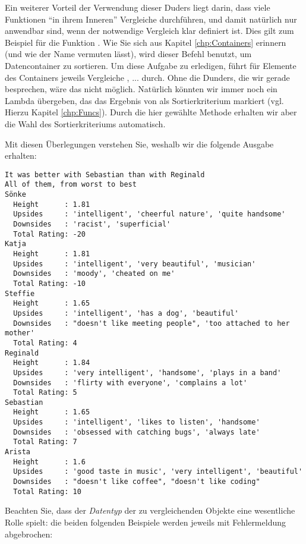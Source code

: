 Ein weiterer Vorteil der Verwendung dieser Duders liegt darin, dass viele Funktionen \enquote{in ihrem Inneren} Vergleiche durchführen, und damit natürlich nur anwendbar sind, wenn der notwendige Vergleich klar definiert ist. Dies gilt zum Beispiel für die Funktion . Wie Sie sich aus Kapitel \ref{chp:Containers} erinnern (und wie der Name vermuten lässt), wird dieser Befehl benutzt, um Datencontainer zu sortieren. Um diese Aufgabe zu erledigen, führt  für Elemente  des Containers jeweils Vergleiche , ... durch. Ohne die Dunders, die wir gerade besprechen, wäre das nicht möglich. Natürlich könnten wir immer noch ein Lambda übergeben, das das Ergebnis von  als Sortierkriterium markiert (vgl. Hierzu Kapitel \ref{chp:Funcs}). Durch die hier gewählte Methode erhalten wir aber die Wahl des Sortierkriteriums automatisch.

Mit diesen Überlegungen verstehen Sie, weshalb wir die folgende Ausgabe erhalten:

\begin{cmdbox}
\begin{verbatim}
It was better with Sebastian than with Reginald
All of them, from worst to best
Sönke
  Height      : 1.81
  Upsides     : 'intelligent', 'cheerful nature', 'quite handsome'
  Downsides   : 'racist', 'superficial'
  Total Rating: -20
Katja
  Height      : 1.81
  Upsides     : 'intelligent', 'very beautiful', 'musician'
  Downsides   : 'moody', 'cheated on me'
  Total Rating: -10
Steffie
  Height      : 1.65
  Upsides     : 'intelligent', 'has a dog', 'beautiful'
  Downsides   : "doesn't like meeting people", 'too attached to her mother'
  Total Rating: 4
Reginald
  Height      : 1.84
  Upsides     : 'very intelligent', 'handsome', 'plays in a band'
  Downsides   : 'flirty with everyone', 'complains a lot'
  Total Rating: 5
Sebastian
  Height      : 1.65
  Upsides     : 'intelligent', 'likes to listen', 'handsome'
  Downsides   : 'obsessed with catching bugs', 'always late'
  Total Rating: 7
Arista
  Height      : 1.6
  Upsides     : 'good taste in music', 'very intelligent', 'beautiful'
  Downsides   : "doesn't like coffee", "doesn't like coding"
  Total Rating: 10
\end{verbatim}
\end{cmdbox}

Beachten Sie, dass der \emph{Datentyp} der zu vergleichenden Objekte eine wesentliche Rolle spielt: die beiden folgenden Beispiele werden jeweils mit Fehlermeldung abgebrochen:

